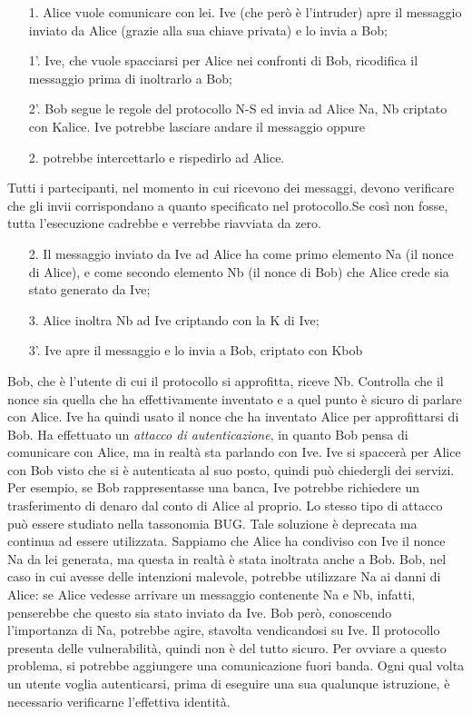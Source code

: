 \begin{enumerate}
    \item[1.]  Alice vuole comunicare con lei. Ive (che però è l’intruder)
        apre il messaggio inviato da Alice
        (grazie alla sua chiave privata) e lo invia a Bob;
    \item[1'.] Ive, che vuole spacciarsi per Alice nei confronti di Bob,
        ricodifica il messaggio prima di inoltrarlo
        a Bob;
    \item[2'.] Bob segue le regole del protocollo N-S ed invia ad Alice
            {Na, Nb} criptato con Kalice. Ive
        potrebbe lasciare andare il messaggio oppure 
    \item[2.] potrebbe intercettarlo e rispedirlo ad Alice.
\end{enumerate}
Tutti i partecipanti, nel momento in cui ricevono dei messaggi, devono
verificare che gli invii
corrispondano a quanto specificato nel protocollo.Se così non fosse, tutta 
l’esecuzione cadrebbe e
verrebbe riavviata da zero.

\begin{enumerate}
    \item[2.] Il messaggio inviato da Ive ad Alice ha come primo
        elemento Na (il nonce di Alice), e come secondo elemento Nb
        (il nonce di Bob) che Alice crede sia stato
        generato da Ive;
    \item[3.] Alice inoltra Nb ad Ive criptando con la K di Ive;
    \item[3'.] Ive apre il messaggio e lo invia a Bob, criptato con Kbob
\end{enumerate}

Bob, che è l’utente di cui il protocollo si approfitta, riceve Nb. 
Controlla che il nonce sia quella che
ha effettivamente inventato e a quel punto è sicuro di parlare con Alice.
Ive ha quindi usato il nonce che ha inventato Alice per approfittarsi di 
Bob. Ha effettuato un
\textit{attacco di autenticazione}, in quanto Bob pensa di comunicare con 
Alice, ma in realtà sta parlando
con Ive.
Ive si spaccerà per Alice con Bob visto che si è autenticata al suo posto,
quindi può chiedergli dei
servizi. Per esempio, se Bob rappresentasse una banca, Ive potrebbe
richiedere un trasferimento
di denaro dal conto di Alice al proprio.
Lo stesso tipo di attacco può essere studiato nella tassonomia BUG. Tale 
soluzione è deprecata
ma continua ad essere utilizzata.
Sappiamo che Alice ha condiviso con Ive il nonce Na da lei generata, ma 
questa in realtà è stata
inoltrata anche a Bob. Bob, nel caso in cui avesse delle intenzioni 
malevole, potrebbe utilizzare Na
ai danni di Alice: se Alice vedesse arrivare un messaggio contenente Na
e Nb, infatti, penserebbe
che questo sia stato inviato da Ive. Bob però, conoscendo l’importanza di
Na, potrebbe agire,
stavolta vendicandosi su Ive.
Il protocollo presenta delle vulnerabilità, quindi non è del tutto sicuro.
Per ovviare a questo
problema, si potrebbe aggiungere una comunicazione fuori banda. Ogni qual
volta un utente voglia
autenticarsi, prima di eseguire una sua qualunque istruzione, è necessario 
verificarne l’effettiva
identità.

